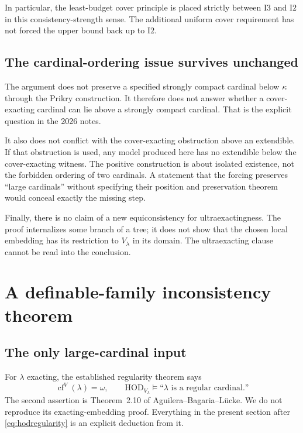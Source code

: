 \documentclass[11pt,letterpaper]{article}
\theoremstyle{definition}
\newcommand{\HOD}{\mathrm{HOD}}
\newcommand{\cf}{\operatorname{cf}}
\newcommand{\Itwo}{\mathrm{I2}}
\newcommand{\Ithree}{\mathrm{I3}}
\begin{document}
In particular, the least-budget cover principle is placed strictly
between $\Ithree$ and $\Itwo$ in this consistency-strength sense.
The additional uniform cover requirement has not forced the upper bound
back up to $\Itwo$.

\subsection{The cardinal-ordering issue survives unchanged}

The argument does not preserve a specified strongly compact cardinal
below $\kappa$ through the Prikry construction. It therefore does not
answer whether a cover-exacting cardinal can lie above a strongly compact
cardinal. That is the explicit question in the 2026 notes.\cite[Problem~5.2]{cover}

It also does not conflict with the cover-exacting obstruction above an
extendible. If that obstruction is used, any model produced here has no
extendible below the cover-exacting witness. The positive construction is
about isolated existence, not the forbidden ordering of two cardinals.
A statement that the forcing preserves ``large cardinals'' without
specifying their position and preservation theorem would conceal exactly
the missing step.

Finally, there is no claim of a new equiconsistency for ultraexactingness.
The proof internalizes some branch of a tree; it does not show that the
chosen local embedding has its restriction to $V_\lambda$ in its domain.
The ultraexacting clause cannot be read into the conclusion.

\section{A definable-family inconsistency theorem}\label{sec:families}

\subsection{The only large-cardinal input}

For $\lambda$ exacting, the established regularity theorem says
\begin{equation}\label{eq:hodregularity}
 \cf^V(\lambda)=\omega,\qquad
 \HOD_{V_\lambda}\models\text{``$\lambda$ is a regular cardinal.''}
\end{equation}
The second assertion is Theorem~2.10 of
Aguilera--Bagaria--L\"ucke.\cite{abl}
We do not reproduce its exacting-embedding proof. Everything in the
present section after \eqref{eq:hodregularity} is an explicit deduction
from it.
\end{document}
